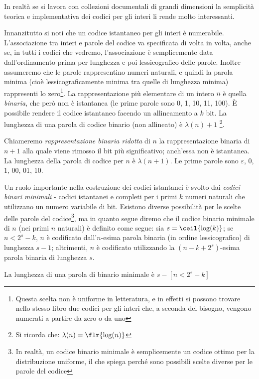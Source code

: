 In realtà se si lavora con collezioni documentali di grandi dimensioni la semplicità teorica e implementativa dei codici per gli interi li rende molto interessanti.

Innanzitutto si noti che un codice istantaneo per gli interi è numerabile. L'associazione tra interi e parole del codice va specificata di volta in volta, anche se, in tutti i codici che vedremo, l'associazione è semplicemente data dall'ordinamento prima per lunghezza e poi lessicografico delle parole. Inoltre assumeremo che le parole rappresentino numeri naturali, e quindi la parola minima (cioè lessicograficamente minima tra quelle di lunghezza minima) rappresenti lo zero\footnote{Questa scelta non è uniforme in letteratura, e in effetti si possono trovare nello stesso libro due codici per gli interi che, a seconda del bisogno, vengono numerati a partire da zero o da uno}.
La rappresentazione più elementare di un intero $n$ è quella \textit{binaria}, che però non è istantanea (le prime parole sono 0, 1, 10, 11, 100). È possibile rendere il codice istantaneo facendo un allineamento a $k$ bit. La lunghezza di una parola di codice binario (non allineato) è $\lambda(n) + 1$ \footnote{Si ricorda che: $\lambda(n) = \flr{\log(n)}$}.

Chiameremo \textit{rappresentazione binaria ridotta} di $n$ la rappresentazione binaria di $n + 1$ alla quale viene rimosso il bit più significativo; anch'essa non è istantanea. La lunghezza della parola di codice per $n$ è $\lambda(n + 1)$. Le prime parole sono $\varepsilon$, 0, 1, 00, 01, 10.

Un ruolo importante nella costruzione dei codici istantanei è svolto dai \textit{codici binari minimali} - codici istantanei e completi per i primi $k$ numeri naturali che utilizzano un numero variabile di bit. Esistono diverse possibilità per le scelte delle parole del codice\footnote{In realtà, un codice binario minimale è semplicemente un codice ottimo per la distribuzione uniforme, il che spiega perché sono possibili scelte diverse per le parole del codice}, ma in quanto segue diremo che il codice binario minimale di $n$ (nei primi $n$ naturali) è definito come segue: sia $s = \ceil{\log(k)}$; se $n < 2^s -k$, $n$ è codificato dall'$n$-esima parola binaria (in ordine lessicografico) di lunghezza $s - 1$; altrimenti, $n$ è codificato utilizzando la $(n - k + 2^s)$-esima parola binaria di lunghezza $s$.

La lunghezza di una parola di binario minimale è $s - [n < 2^s - k]$

